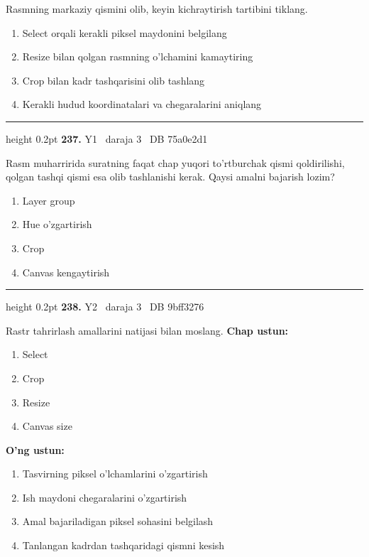 \documentclass[10pt,a4paper,oneside]{article}
\begin{document}
Rasmning markaziy qismini olib, keyin kichraytirish tartibini tiklang.
\begin{enumerate}[label=\Alph*),leftmargin=9mm]
\item Select orqali kerakli piksel maydonini belgilang
\item Resize bilan qolgan rasmning o'lchamini kamaytiring
\item Crop bilan kadr tashqarisini olib tashlang
\item Kerakli hudud koordinatalari va chegaralarini aniqlang
\end{enumerate}
\vspace{2mm}\hrule height 0.2pt \vspace{4mm}
\hypertarget{q237}{\textbf{\color{ink}237.}}  {\color{muted}\scriptsize Y1 \textbullet\ daraja 3 \textbullet\ DB 75a0e2d1}
\par
Rasm muharririda suratning faqat chap yuqori to'rtburchak qismi qoldirilishi, qolgan tashqi qismi esa olib tashlanishi kerak. Qaysi amalni bajarish lozim?
\begin{enumerate}[label=\Alph*),leftmargin=9mm]
\item Layer group
\item Hue o'zgartirish
\item Crop
\item Canvas kengaytirish
\end{enumerate}
\vspace{2mm}\hrule height 0.2pt \vspace{4mm}
\hypertarget{q238}{\textbf{\color{ink}238.}}  {\color{muted}\scriptsize Y2 \textbullet\ daraja 3 \textbullet\ DB 9bff3276}
\par
Rastr tahrirlash amallarini natijasi bilan moslang.
\textbf{\footnotesize Chap ustun:}
\begin{enumerate}[label=\arabic*),leftmargin=9mm]
\item Select
\item Crop
\item Resize
\item Canvas size
\end{enumerate}
\textbf{\footnotesize O'ng ustun:}
\begin{enumerate}[label=\Alph*),leftmargin=9mm]
\item Tasvirning piksel o'lchamlarini o'zgartirish
\item Ish maydoni chegaralarini o'zgartirish
\item Amal bajariladigan piksel sohasini belgilash
\item Tanlangan kadrdan tashqaridagi qismni kesish
\end{enumerate}
\end{document}

